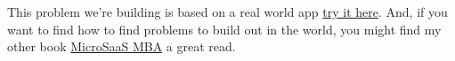 \documentclass[11pt]{article}
\begin{document}
    This problem we're building is based on a real world app \href{#}{try it here}. And, if you want to find how to find problems to build out in the world, you might find my other book \href{#}{MicroSaaS MBA} a great read.
\end{document}
